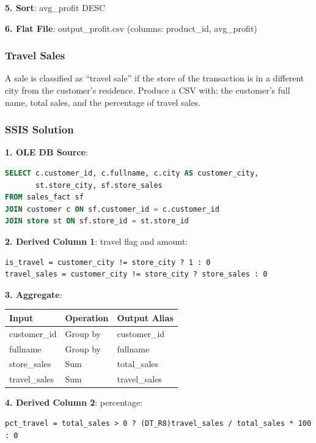 \textbf{5. Sort}: avg\_profit DESC

\textbf{6. Flat File}: output\_profit.csv (columns: product\_id, avg\_profit)

\subsubsection{Travel Sales}
\label{subsec:ex-travel-sales}

\begin{theorybox}[frametitle={Exercise}]
A sale is classified as ``travel sale'' if the store of the transaction is in a different city from the customer's residence. Produce a CSV with: the customer's full name, total sales, and the percentage of travel sales.
\end{theorybox}

\subsubsection*{SSIS Solution}

\textbf{1. OLE DB Source}:
\begin{lstlisting}[language=SQL]
SELECT c.customer_id, c.fullname, c.city AS customer_city,
       st.store_city, sf.store_sales
FROM sales_fact sf
JOIN customer c ON sf.customer_id = c.customer_id
JOIN store st ON sf.store_id = st.store_id
\end{lstlisting}

\textbf{2. Derived Column 1}: travel flag and amount:
\begin{lstlisting}
is_travel = customer_city != store_city ? 1 : 0
travel_sales = customer_city != store_city ? store_sales : 0
\end{lstlisting}

\textbf{3. Aggregate}:
\begin{center}
\scriptsize
\begin{tabular}{@{}lll@{}}
\toprule
\textbf{Input} & \textbf{Operation} & \textbf{Output Alias} \\
\midrule
customer\_id & Group by & customer\_id \\
fullname & Group by & fullname \\
store\_sales & Sum & total\_sales \\
travel\_sales & Sum & travel\_sales \\
\bottomrule
\end{tabular}
\end{center}

\textbf{4. Derived Column 2}: percentage:
\begin{lstlisting}
pct_travel = total_sales > 0 ? (DT_R8)travel_sales / total_sales * 100 : 0
\end{lstlisting}

